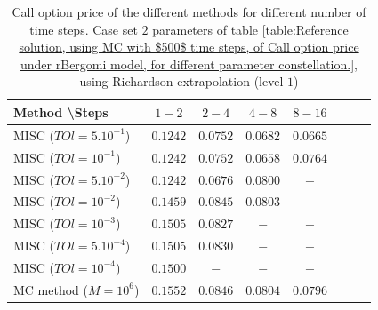 \documentclass[11pt]{article}
\begin{document}
\begin{table}[h!]
	\centering
	\begin{tabular}{l*{6}{c}r}
		Method \textbackslash  Steps    &$1-2$         & $2-4$ & $4-8$ & $8-16$\\
		\hline
		MISC ($TOl=5.10^{-1}$)  &$0.1242$ & $0.0752$ & $0.0682$ & $0.0665$ \\
		MISC ($TOl=10^{-1}$)  &$0.1242$ & $0.0752$ & $0.0658$ & $0.0764$  \\
		MISC ($TOl=5.10^{-2}$)   &$0.1242$ & $0.0676$ & $0.0800$ & $-$   \\
		MISC ($TOl=10^{-2}$)  &$0.1459$ & $0.0845$ & $0.0803$ & $-$  \\	
		MISC ($TOl=10^{-3}$)  &$0.1505$ & $0.0827$ & $-$ & $-$ \\
			MISC ($TOl=5.10^{-4}$)  &$0.1505$ & $0.0830$ & $-$ & $-$ \\
		MISC ($TOl=10^{-4}$)  &$0.1500$ & $-$ & $-$ & $-$ \\
		\hline
			MC method ($M=10^{6}$)   & $0.1552 $  & $0.0846 $  & $0.0804$ & $0.0796 $ \\		
		\hline
	\end{tabular}
	\caption{Call option price of the different methods for different number of time steps. Case set $2$ parameters of table \ref{table:Reference solution, using MC with $500$ time steps, of Call option price under rBergomi model, for different parameter constellation.}, using Richardson extrapolation (level $1$)}
	\label{table:  Call option price of the different methods for different number of time steps. Case set $2$ parameter, using Richardson extrapolation (level $1$)}
\end{table}
\end{document}
